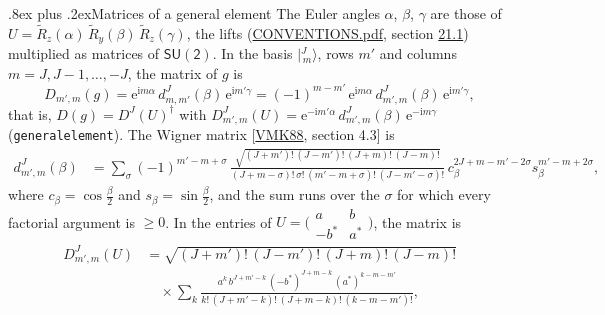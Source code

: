 \documentclass[10pt,a4paper]{article}
\makeatletter
\renewcommand\subsection{\@startsection{subsection}{2}{\z@}{-2.5ex plus -1ex minus -.2ex}%
  {.8ex plus .2ex}{\normalfont\sffamily\bfseries\color{parttitle}}}
\numberwithin{equation}{section}
\newcommand{\grp}[1]{\mathsf{#1}}
\newcommand{\iunit}{\mathrm{i}}
\newcommand{\expe}{\mathrm{e}}
\newcommand{\wignerD}[1]{D^{#1}}
\newcommand{\wignerd}[1]{d^{#1}}
\newcommand{\conj}[1]{{#1}^{*}}
\newcommand{\jm}[2]{\bigl\lvert{}^{#1}_{\,#2}\bigr\rangle}
\newcommand{\lift}[1]{\tilde{#1}}
\makeatother
\begin{document}
\subsection{Matrices of a general element}\label{s:general}
\leavevmode\label{n:angle.euler.alpha}\label{n:angle.euler.beta}\label{n:angle.euler.gamma}The Euler angles $\alpha$, $\beta$, $\gamma$ are those of $U = \lift{R}_z(\alpha)\,\lift{R}_y(\beta)\,\lift{R}_z(\gamma)$, the lifts (\href{../../CONVENTIONS.pdf}{CONVENTIONS.pdf}, section \href{../../CONVENTIONS.pdf\#conv.21.1}{21.1}) multiplied as matrices of $\grp{SU(2)}$. \label{n:matrix.irrep.entry}In the basis $\jm{J}{m}$, rows $m'$ and columns $m = J, J-1, \dots, -J$, the matrix of $g$ is
\begin{equation}\label{e:euler}D_{m',m}(g) = \expe^{\iunit m\alpha}\,\wignerd{J}_{m,m'}(\beta)\,\expe^{\iunit m'\gamma} = (-1)^{m-m'}\,\expe^{\iunit m\alpha}\,\wignerd{J}_{m',m}(\beta)\,\expe^{\iunit m'\gamma},\end{equation}
\leavevmode\label{n:matrix.wigner}that is, $D(g) = \wignerD{J}(U)^\dagger$ with $\wignerD{J}_{m',m}(U) = \expe^{-\iunit m'\alpha}\,\wignerd{J}_{m',m}(\beta)\,\expe^{-\iunit m\gamma}$ (\texttt{generalelement}). \label{n:matrix.wigner.small}\label{n:index.halfangle}\label{n:local.sum.wigner}The Wigner matrix [\href{../../../REFERENCES.pdf\#ref.VMK88}{VMK88}, section 4.3] is
\begin{equation}\label{e:wigner}\begin{aligned}\wignerd{J}_{m',m}(\beta) &= \sum_\sigma (-1)^{m'-m+\sigma}\,\frac{\sqrt{(J+m')!\,(J-m')!\,(J+m)!\,(J-m)!}}{(J+m-\sigma)!\,\sigma!\,(m'-m+\sigma)!\,(J-m'-\sigma)!}\,c_\beta^{2J+m-m'-2\sigma}s_\beta^{m'-m+2\sigma},\end{aligned}\end{equation}
where $c_\beta = \cos\tfrac{\beta}{2}$ and $s_\beta = \sin\tfrac{\beta}{2}$, and the sum runs over the $\sigma$ for which every factorial argument is $\ge 0$. \label{n:index.cayleyklein}\label{n:local.sum.cayleyklein}In the entries of $U = \bigl(\begin{smallmatrix} a & b\\ -\conj{b} & \conj{a}\end{smallmatrix}\bigr)$, the matrix is
\begin{equation}\label{e:entries}\begin{aligned}\wignerD{J}_{m',m}(U) &= \sqrt{(J+m')!\,(J-m')!\,(J+m)!\,(J-m)!}\\ &\quad\times\sum_k\frac{a^{k}\,b^{J+m'-k}\,(-\conj{b})^{J+m-k}\,(\conj{a})^{k-m-m'}}{k!\,(J+m'-k)!\,(J+m-k)!\,(k-m-m')!},\end{aligned}\end{equation}
\end{document}
